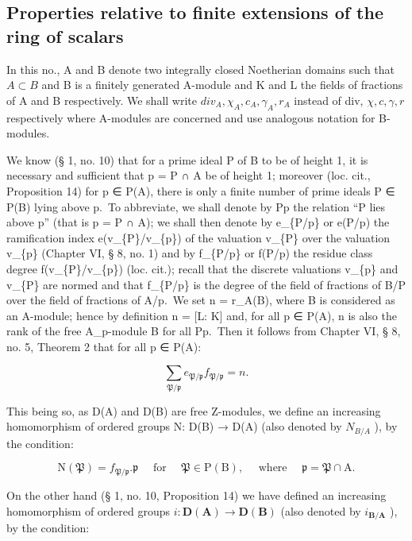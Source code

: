 \subsection{Properties relative to finite extensions of the ring of scalars}

In this no., A and B denote two integrally closed Noetherian domains such that \(A \subset B\) and B is a finitely generated A-module and K and L the fields of fractions of A and B respectively. We shall write \(div_{A}, \chi_{A}, c_{A}, \gamma_{A}, r_{A}\) instead of div, \(\chi, c, \gamma, r\) respectively where A-modules are concerned and use analogous notation for B-modules.

We know (§ 1, no. 10) that for a prime ideal P of B to be of height 1, it is necessary and sufficient that p = P ∩ A be of height 1; moreover (loc. cit., Proposition 14) for p ∈ P(A), there is only a finite number of prime ideals P ∈ P(B) lying above p.~To abbreviate, we shall denote by P\textbar p the relation ``P lies above p'' (that is p = P ∩ A); we shall then denote by e\_\{P/p\} or e(P/p) the ramification index e(v\_\{P\}/v\_\{p\}) of the valuation v\_\{P\} over the valuation v\_\{p\} (Chapter VI, § 8, no. 1) and by f\_\{P/p\} or f(P/p) the residue class degree f(v\_\{P\}/v\_\{p\}) (loc. cit.); recall that the discrete valuations v\_\{p\} and v\_\{P\} are normed and that f\_\{P/p\} is the degree of the field of fractions of B/P over the field of fractions of A/p.~We set n = r\_A(B), where B is considered as an A-module; hence by definition n = {[}L: K{]} and, for all p ∈ P(A), n is also the rank of the free A\_p-module B for all P\textbar p.~Then it follows from Chapter VI, § 8, no. 5, Theorem 2 that for all p ∈ P(A):

\[
\sum_ {\mathfrak {P} / \mathfrak {p}} e _ {\mathfrak {P} / \mathfrak {p}} f _ {\mathfrak {P} / \mathfrak {p}} = n.\tag{9}
\]

This being so, as D(A) and D(B) are free Z-modules, we define an increasing homomorphism of ordered groups N: D(B) → D(A) (also denoted by \(N_{B/A}\) ), by the condition:

\[
\mathrm{N} (\mathfrak {P}) = f _ {\mathfrak {P} / \mathfrak {p}}. \mathfrak {p} \quad \text {   for   } \quad \mathfrak {P} \in \mathrm{P} (\mathrm{B}), \quad \text {   where   } \quad \mathfrak {p} = \mathfrak {P} \cap \mathrm{A}.\tag{10}
\]

On the other hand (§ 1, no. 10, Proposition 14) we have defined an increasing homomorphism of ordered groups \(i\colon\mathbf{D}(\mathbf{A})\to\mathbf{D}(\mathbf{B})\) (also denoted by \(i_{\mathbf{B}/\mathbf{A}}\) ), by the condition:

